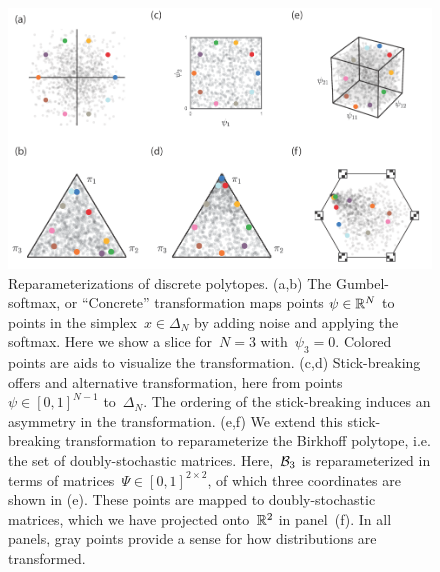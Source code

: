 \documentclass[twoside]{article}
\begin{document}
\begin{figure}[ht!]
  \centering
  \includegraphics[width=4.5in]{../figures/figure1b.pdf} 
  \caption{Reparameterizations of discrete polytopes.  (a,b) The
    Gumbel-softmax, or ``Concrete'' transformation maps points
    ${\psi \in \mathbb{R}^N}$ to points in the
    simplex~${x \in \Delta_{N}}$ by adding noise and applying the
    softmax.  Here we show a slice for~$N=3$ with~$\psi_3=0$. Colored
    points are aids to visualize the transformation.  (c,d)
    Stick-breaking offers and alternative transformation, here from
    points~$\psi \in [0,1]^{N-1}$ to~$\Delta_N$.  The ordering of the
    stick-breaking induces an asymmetry in the transformation.  (e,f)
    We extend this stick-breaking transformation to reparameterize the
    Birkhoff polytope, i.e. the set of doubly-stochastic
    matrices. Here,~$\mathcal{B}_3$ is reparameterized in terms of
    matrices~$\Psi \in [0,1]^{2 \times 2}$, of which three coordinates
    are shown in (e).  These points are mapped to doubly-stochastic
    matrices, which we have projected onto~$\mathbb{R}^2$ in panel~(f).
    In all panels, gray points provide a sense for how distributions
    are transformed.
  }
\label{fig:transforms}
\end{figure}
\end{document}

